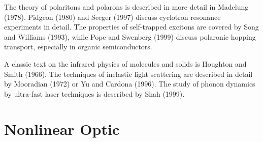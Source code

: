 \documentclass[12pt]{book}
\begin{document}
The theory of polaritons and polarons is described in more detail in Madelung (1978). Pidgeon (1980) and Seeger (1997) discuss cyclotron resonance experiments in detail. The properties of self-trapped excitons are covered by Song and Williams (1993), while Pope and Swenberg (1999) discuss polaronic hopping transport, especially in organic semiconductors.

A classic text on the infrared physics of molecules and solids is Houghton and Smith (1966). The techniques of inelastic light scattering are described in detail by Mooradian (1972) or Yu and Cardona (1996). The study of phonon dynamics by ultra-fast laser techniques is described by Shah (1999).

\chapter{Nonlinear Optic}\label{chap:11}
\end{document}
